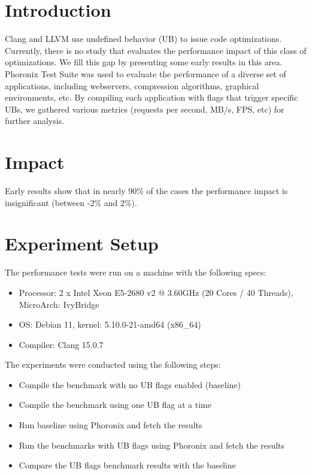 \documentclass{sciposter}
\begin{document}
\begin{multicols}{3}

\section{Introduction}
Clang and LLVM use undefined behavior (UB) to issue code optimizations.
Currently, there is no study that evaluates the performance impact of this class
of optimizations. We fill this gap by presenting some early results in this
area. Phoronix Test Suite was used to evaluate the performance of a diverse set
of applications, including webservers, compression algorithms, graphical
environments, etc. By compiling each application with flags that trigger
specific UBs, we gathered various metrics (requests per second, MB/s, FPS,
etc) for further analysis.

\section{Impact}
Early results show that in nearly 90\% of the cases
the performance impact is insignificant (between -2\% and 2\%).

\section{Experiment Setup}
The performance tests were run on a machine with the following specs:
\begin{itemize}
\item Processor: 2 x Intel Xeon E5-2680 v2 @ 3.60GHz (20 Cores / 40 Threads), MicroArch: IvyBridge
\item OS: Debian 11, kernel: 5.10.0-21-amd64 (x86\_64)
\item Compiler: Clang 15.0.7
\end{itemize}
\bigbreak
\bigbreak
The experiments were conducted using the following steps:
\begin{itemize}
\item Compile the benchmark with no UB flags enabled (baseline)
\item Compile the benchmark using one UB flag at a time
\item Run baseline using Phoronix and fetch the results
\item Run the benchmarks with UB flags using Phoronix and fetch the results
\item Compare the UB flags benchmark results with the baseline
\end{itemize}


\end{multicols}
\end{document}
